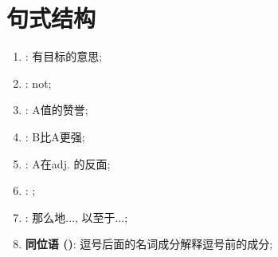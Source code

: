 \chapter{句式结构}

\begin{enumerate}
  \item \textbf{}: 有目标的意思;
  \item \textbf{}: not;
  \item \textbf{}: A值的赞誉;
  \item \textbf{}: B比A更强;
  \item \textbf{}: A在adj. 的反面;
  \item \textbf{}: ;
  \item \textbf{}: 那么地..., 以至于...;
  \item \textbf{同位语 ()}: 逗号后面的名词成分解释逗号前的成分;
\end{enumerate}
